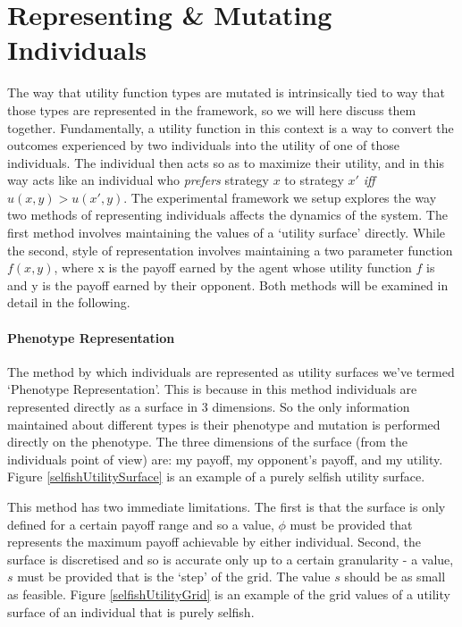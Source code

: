 \documentclass[11pt]{book}
\newcommand*{\np}{\par\noindent\newline}
\begin{document}
\section{Representing \& Mutating Individuals}\label{representing_mutating}
\np The way that utility function types are mutated is intrinsically tied to way that those types are represented in the framework, so we will here discuss them together.
Fundamentally, a utility function in this context is a way to convert the outcomes experienced by two individuals into the utility of one of those individuals.
The individual then acts so as to maximize their utility, and in this way acts like an individual who \textit{prefers} strategy $x$ to strategy $x'$ \textit{iff} $u(x, y) > u(x', y)$.
The experimental framework we setup explores the way two methods of representing individuals affects the dynamics of the system.
The first method involves maintaining the values of a `utility surface' directly. 
While the second, style of representation involves maintaining a two parameter function $f(x,y)$, where x is the payoff earned by the agent whose utility function $f$ is and y is the payoff earned by their opponent. 
Both methods will be examined in detail in the following.

\paragraph{Phenotype Representation}
\np The method by which individuals are represented as utility surfaces we've termed `Phenotype Representation'.
This is because in this method individuals are represented directly as a surface in 3 dimensions.
So the only information maintained about different types is their phenotype and mutation is performed directly on the phenotype.
The three dimensions of the surface (from the individuals point of view) are: my payoff, my opponent's payoff, and my utility.
Figure \ref{selfishUtilitySurface} is an example of a purely selfish utility surface.

\np This method has two immediate limitations. 
The first is that the surface is only defined for a certain payoff range and so a value, $\phi$ must be provided that represents the maximum payoff achievable by either individual.
Second, the surface is discretised and so is accurate only up to a certain granularity - a value, $s$ must be provided that is the `step' of the grid.
The value $s$ should be as small as feasible. 
Figure \ref{selfishUtilityGrid} is an example of the grid values of a utility surface of an individual that is purely selfish.
\end{document}
